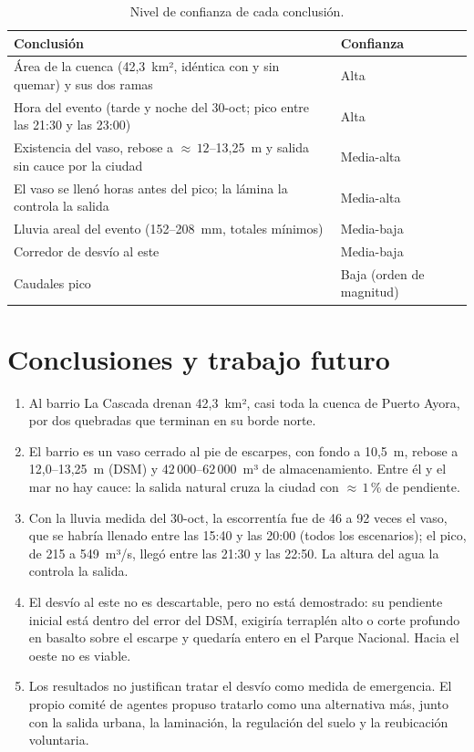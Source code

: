\documentclass{sosg-informe}
\begin{document}
\begin{table}[ht]
  \centering\small
  \caption{Nivel de confianza de cada conclusión.}
  \label{tab:confianza}
  \begin{tabularx}{\linewidth}{>{\raggedright\arraybackslash}Xl}
    \toprule
    Conclusión & Confianza \\
    \midrule
    Área de la cuenca (42,3~km², idéntica con y sin quemar) y sus dos ramas & Alta \\
    Hora del evento (tarde y noche del 30-oct; pico entre las 21:30 y las 23:00) & Alta \\
    Existencia del vaso, rebose a ${\approx}\,12$--13,25~m y salida sin cauce por la ciudad & Media-alta \\
    El vaso se llenó horas antes del pico; la lámina la controla la salida & Media-alta \\
    Lluvia areal del evento (152--208~mm, totales mínimos) & Media-baja \\
    Corredor de desvío al este & Media-baja \\
    Caudales pico & Baja (orden de magnitud) \\
    \bottomrule
  \end{tabularx}
\end{table}

\section{Conclusiones y trabajo futuro}
\begin{enumerate}
  \item Al barrio La Cascada drenan 42,3~km², casi toda la cuenca de Puerto Ayora, por dos quebradas que terminan en su borde norte.
  \item El barrio es un vaso cerrado al pie de escarpes, con fondo a 10,5~m, rebose a 12,0--13,25~m (DSM) y 42\,000--62\,000~m³ de almacenamiento. Entre él y el mar no hay cauce: la salida natural cruza la ciudad con ${\approx}\,1$\,\% de pendiente.
  \item Con la lluvia medida del 30-oct, la escorrentía fue de 46 a 92 veces el vaso, que se habría llenado entre las 15:40 y las 20:00 (todos los escenarios); el pico, de 215 a 549~m³/s, llegó entre las 21:30 y las 22:50. La altura del agua la controla la salida.
  \item El desvío al este no es descartable, pero no está demostrado: su pendiente inicial está dentro del error del DSM, exigiría terraplén alto o corte profundo en basalto sobre el escarpe y quedaría entero en el Parque Nacional. Hacia el oeste no es viable.
  \item Los resultados no justifican tratar el desvío como medida de emergencia. El propio comité de agentes propuso tratarlo como una alternativa más, junto con la salida urbana, la laminación, la regulación del suelo y la reubicación voluntaria.
\end{enumerate}
\end{document}

